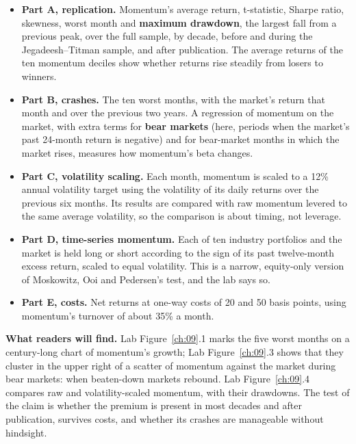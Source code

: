 \begin{itemize}
  \item \textbf{Part A, replication.} Momentum's average return, t-statistic, Sharpe ratio, skewness, worst month and \textbf{maximum drawdown}, the largest fall from a previous peak, over the full sample, by decade, before and during the Jegadeesh--Titman sample, and after publication. The average returns of the ten momentum deciles show whether returns rise steadily from losers to winners.
  \item \textbf{Part B, crashes.} The ten worst months, with the market's return that month and over the previous two years. A regression of momentum on the market, with extra terms for \textbf{bear markets} (here, periods when the market's past 24-month return is negative) and for bear-market months in which the market rises, measures how momentum's beta changes.
  \item \textbf{Part C, volatility scaling.} Each month, momentum is scaled to a 12\% annual volatility target using the volatility of its daily returns over the previous six months. Its results are compared with raw momentum levered to the same average volatility, so the comparison is about timing, not leverage.
  \item \textbf{Part D, time-series momentum.} Each of ten industry portfolios and the market is held long or short according to the sign of its past twelve-month excess return, scaled to equal volatility. This is a narrow, equity-only version of Moskowitz, Ooi and Pedersen's test, and the lab says so.
  \item \textbf{Part E, costs.} Net returns at one-way costs of 20 and 50 basis points, using momentum's turnover of about 35\% a month.
\end{itemize}

\textbf{What readers will find.} Lab Figure~\ref{ch:09}.1 marks the five worst months on a century-long chart of momentum's growth; Lab Figure~\ref{ch:09}.3 shows that they cluster in the upper right of a scatter of momentum against the market during bear markets: when beaten-down markets rebound. Lab Figure~\ref{ch:09}.4 compares raw and volatility-scaled momentum, with their drawdowns. The test of the claim is whether the premium is present in most decades and after publication, survives costs, and whether its crashes are manageable without hindsight.

